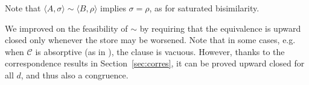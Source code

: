 \documentclass[preprint,12pt]{elsarticle}
\newtheorem{definition}{Definition}
\newtheorem{lemma}{Lemma}
\newtheorem{proposition}{Proposition}
\newcommand{\comment}[1]{}
\def\monid{{\mathbf 0}}
\def\monid{\mathbf{1}}
\begin{document}
Note that $\langle A, \sigma \rangle \sim \langle B, \rho \rangle$ implies
$\sigma = \rho$, as for saturated bisimilarity.
%
\comment{
	\begin{definition}[Weak bisimilarity]\label{def:weakbis} A weak bisimulation is a symmetric relation $R$ on configurations such that whenever
		$( \langle A, \sigma \rangle,\langle B, \rho \rangle) \in R$
		\begin{enumerate}
			\item if $\langle A, \sigma \rangle \downarrow_c$ then $\langle B, \rho \rangle \Downarrow_c$;
			\item if $\langle A, \sigma \rangle \xrightarrow{\alpha} \gamma_1$ then there is $\gamma_2$ such that $\langle B, \rho \otimes \alpha \rangle \Rightarrow \gamma_2$ 
			and $(\gamma_1, \gamma_2) \in R$;
		\end{enumerate}
		We say that $\gamma_1$ and $\gamma_2$ are  weakly bisimilar ($\gamma_1  \approx \gamma_2$) if there exists a  
		weak  bisimulation $R$ such that $(\gamma_1 , \gamma_2 ) \in R$. 
		We write $A \approx B$ if $\langle A, \monid \rangle \approx \langle B, \monid \rangle$.
	\end{definition}
	
	\begin{lemma}[Weak bisimilarity, 2]\label{def:weakbis2}
		Weak bisimilarity coincides with the relation 
		obtained from Definition~\ref{def:strongbis} by replacing $\to$ with $\Rightarrow$ and $\downarrow_c$ with $\Downarrow_c$.
	\end{lemma}
	
	\begin{proposition}
		Let $\langle A,\sigma \rangle, \langle B,\rho \rangle$ be configurations 
		and $c, d \in \mathcal{C}$.
		If $\langle A,\sigma \rangle \approx \langle B,\rho \rangle$
		and $\langle A,\sigma \otimes d\rangle \downarrow_c$ then 
		then $\langle B, \rho \otimes d\rangle \Downarrow_c$.
	\end{proposition}
}
%
We improved on the feasibility of $\sim$ by requiring that the equivalence is upward closed 
only whenever the store may be worsened. Note that in some cases, e.g. 
when $\mathcal{C}$ is absorptive (as in  \cite{pippo}), the clause is vacuous. 
%
However, thanks to the correspondence results in Section~\ref{sec:corres}, 
it can be proved upward closed for all $d$, and thus also a congruence.
%
\end{document}
